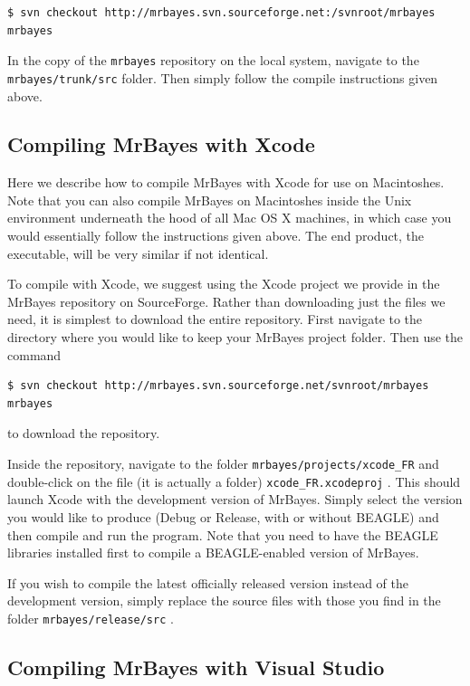 \documentclass[12pt]{book}
\newcommand{\ttt}[1]{\texttt{#1} }
\begin{document}
\begin{verbatim}
$ svn checkout http://mrbayes.svn.sourceforge.net:/svnroot/mrbayes mrbayes
\end{verbatim}

In the copy of the \ttt{mrbayes} repository on the local system, navigate to the \ttt{mrbayes/trunk/src} folder.
Then simply follow the compile instructions given above.

\subsection{Compiling MrBayes with Xcode}

Here we describe how to compile MrBayes with Xcode for use on Macintoshes. Note that you can
also compile MrBayes on Macintoshes inside the Unix environment underneath the hood
of all Mac OS X machines, in which case you would essentially follow the instructions given above. The
end product, the executable, will be very similar if not identical.

To compile with Xcode, we suggest using the Xcode project we provide in the MrBayes repository on
SourceForge. Rather than downloading just the files we need, it is simplest to download the entire
repository. First navigate to the directory where you would like to keep your MrBayes project folder.
Then use the command 

\begin{verbatim}
$ svn checkout http://mrbayes.svn.sourceforge.net/svnroot/mrbayes mrbayes
\end{verbatim}

to download the repository.

Inside the repository, navigate to the folder \ttt{mrbayes/projects/xcode\_FR} and double-click on the file (it
is actually a folder) \ttt{xcode\_FR.xcodeproj}. This should launch Xcode with the development version of
MrBayes. Simply select the version you would like to produce (Debug or Release, with or without BEAGLE)
and then compile and run the program. Note that you need to have the BEAGLE libraries installed first
to compile a BEAGLE-enabled version of MrBayes.

If you wish to compile the latest officially released version instead of the development version, simply replace
the source files with those you find in the folder \ttt{mrbayes/release/src}.

\subsection{Compiling MrBayes with Visual Studio}
\end{document}
